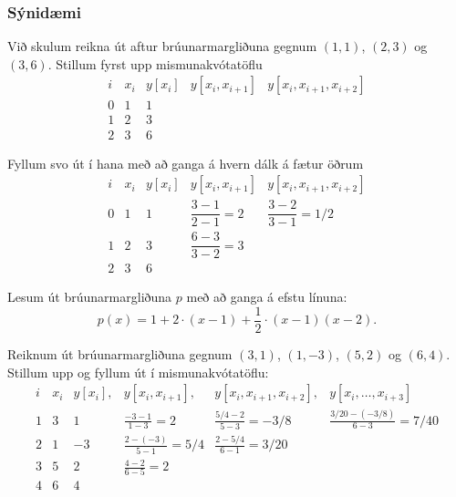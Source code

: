 \documentclass[icelandic,a4paper,12pt]{article}
\begin{document}
\subsubsection{Sýnidæmi} 

Við skulum reikna út aftur brúunarmargliðuna gegnum $(1,1)$, $(2,3)$ og
$(3,6)$. Stillum fyrst upp mismunakvótatöflu 
\begin{equation*}
  \begin{array}{cc||ccc}
    i & x_i & y[x_i] & y[x_i,x_{i+1}] & y[x_i,x_{i+1},x_{i+2}] \\
    \hline
    0 & 1   &  1     &    &   \\
    1 & 2   &  3     &    &   \\
    2 & 3   &  6     &    &   
  \end{array}
\end{equation*}

\pause
Fyllum svo út í hana með að ganga á hvern dálk á fætur öðrum
\begin{equation*}
  \begin{array}{cc||ccc}
    i & x_i & y[x_i] & y[x_i,x_{i+1}] & y[x_i,x_{i+1},x_{i+2}] \\
    \hline
    0 & 1 & 1 & \dfrac{3-1}{2-1} = 2 & \dfrac{3-2}{3-1} = 1/2  \\
    1 & 2 & 3 & \dfrac{6-3}{3-2} = 3 & \\
    2 & 3 & 6 & &   
  \end{array}
\end{equation*}

\pause
Lesum út brúunarmargliðuna $p$ með að ganga á efstu línuna:
\begin{equation*}
  p(x) = 1 + 2 \cdot (x-1) + \frac{1}{2} \cdot (x-1)(x-2).
\end{equation*}


 
Reiknum út brúunarmargliðuna gegnum $(3,1)$, $(1,-3)$, $(5,2)$ og
$(6,4)$. Stillum upp og fyllum út í mismunakvótatöflu: 
\begin{equation*}
  \begin{array}{cc||cccc}
    i & x_i & y[x_i], & y[x_i,x_{i+1}], &
    y[x_i,x_{i+1},x_{i+2}], & y[x_i,\ldots,x_{i+3}] \\
    \hline
    1 & 3 & 1 & \frac{-3-1}{1-3} = 2 & \frac{5/4-2}{5-3} = -3/8 &
    \frac{3/20-(-3/8)}{6-3} = 7/40 \\
    2 & 1 & -3 & \frac{2-(-3)}{5-1} = 5/4 &
    \frac{2-5/4}{6-1} = 3/20 & \\
    3 & 5 & 2 & \frac{4-2}{6-5} = 2 & & \\
    4 & 6 & 4 & & &
  \end{array}
\end{equation*}
\end{document}
